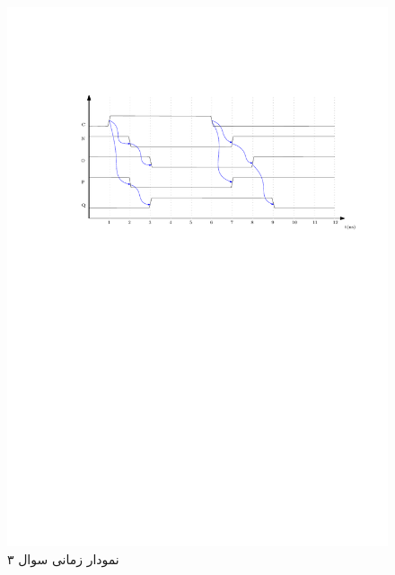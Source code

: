 

\begin{figure}[h]
	\centering
	\includegraphics[width=1\textwidth]{fig/Q3.pdf}
	\caption{نمودار زمانی سوال ۳}
	\label{Q3_Design}
\end{figure}